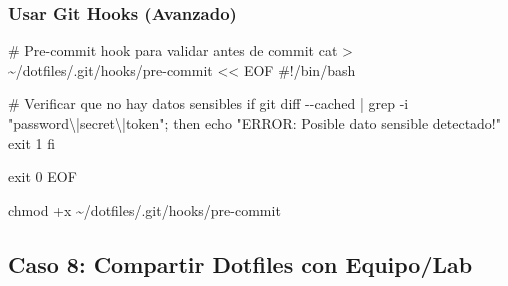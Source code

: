 \documentclass[
  doc,
  floatsintext,
  longtable,
  a4paper,
  nolmodern,
  notxfonts,
  notimes,
  12pt,
  colorlinks=true,linkcolor=blue,citecolor=blue,urlcolor=blue]{apa7}
\newenvironment{Shaded}{\begin{snugshade}}{\end{snugshade}}
\newcommand{\CommentTok}[1]{\textcolor[rgb]{0.37,0.37,0.37}{#1}}
\newcommand{\FunctionTok}[1]{\textcolor[rgb]{0.28,0.35,0.67}{#1}}
\newcommand{\NormalTok}[1]{\textcolor[rgb]{0.00,0.23,0.31}{#1}}
\newcommand{\OperatorTok}[1]{\textcolor[rgb]{0.37,0.37,0.37}{#1}}
\newcommand{\StringTok}[1]{\textcolor[rgb]{0.13,0.47,0.30}{#1}}
\begin{document}
\begin{Shaded}
\end{Shaded}

\subsubsection{Usar Git Hooks (Avanzado)}\label{usar-git-hooks-avanzado}

\begin{Shaded}
\begin{Highlighting}[]
\CommentTok{\# Pre{-}commit hook para validar antes de commit}
\FunctionTok{cat} \OperatorTok{\textgreater{}}\NormalTok{ \textasciitilde{}/dotfiles/.git/hooks/pre{-}commit }\OperatorTok{\textless{}\textless{} \textquotesingle{}EOF\textquotesingle{}}
\StringTok{\#!/bin/bash}

\StringTok{\# Verificar que no hay datos sensibles}
\StringTok{if git diff {-}{-}cached | grep {-}i "password\textbackslash{}|secret\textbackslash{}|token"; then}
\StringTok{    echo "ERROR: Posible dato sensible detectado!"}
\StringTok{    exit 1}
\StringTok{fi}

\StringTok{exit 0}
\OperatorTok{EOF}

\FunctionTok{chmod}\NormalTok{ +x \textasciitilde{}/dotfiles/.git/hooks/pre{-}commit}
\end{Highlighting}
\end{Shaded}

\subsection{Caso 8: Compartir Dotfiles con
Equipo/Lab}\label{caso-8-compartir-dotfiles-con-equipolab}
\end{document}
